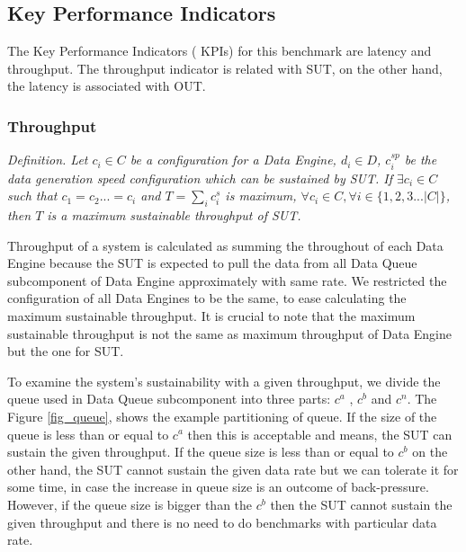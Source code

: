 \subsection{Key Performance Indicators}
The Key Performance Indicators ( KPIs) for this benchmark are latency and throughput. The throughput indicator is related with SUT, on the other hand, the latency is associated with OUT. 


%


\subsubsection{Throughput}
\textit{Definition.  Let $c_{i} \in C$ be a configuration for a Data Engine, $d_{i} \in D$,  $c_{i}^{sp}$ be the data generation speed configuration which can be sustained by SUT. If  $\exists c_{i} \in C$ such that $c_{1} = c_{2}... = c_{i}$ and  $T = \sum_{i}c_{i}^{s}$ is maximum, $\forall c_{i} \in C, \forall i \in \{1,2,3 ... |C|\}$, then $T$ is a maximum sustainable throughput of SUT.}

Throughput of a system is calculated as summing the throughout of each Data Engine  because the SUT is expected to pull the data from all Data Queue subcomponent of Data Engine approximately with same rate. We restricted the configuration of all Data Engines to be the same, to ease calculating the maximum sustainable throughput. It is crucial to note that the maximum sustainable throughput is not the same as maximum throughput of Data Engine but the one for SUT. 

To examine the system's sustainability with a given throughput, we divide the queue used in Data Queue subcomponent into three parts: $c^{a}$ , $c^{b}$ and $c^{n}$. The Figure \ref{fig_queue}, shows the example partitioning of queue. If the size of the queue is less than or equal to $c^{a}$ then this is acceptable and means, the SUT can sustain the given throughput. If the queue size is less than or equal to $c^{b}$ on the other hand, the SUT cannot sustain the given data rate but we can tolerate it for some time, in case the increase in queue size is an outcome of back-pressure. However, if the queue size is bigger than the $c^{b}$ then the SUT cannot sustain the given throughput and there is no need to do benchmarks with particular data rate.

